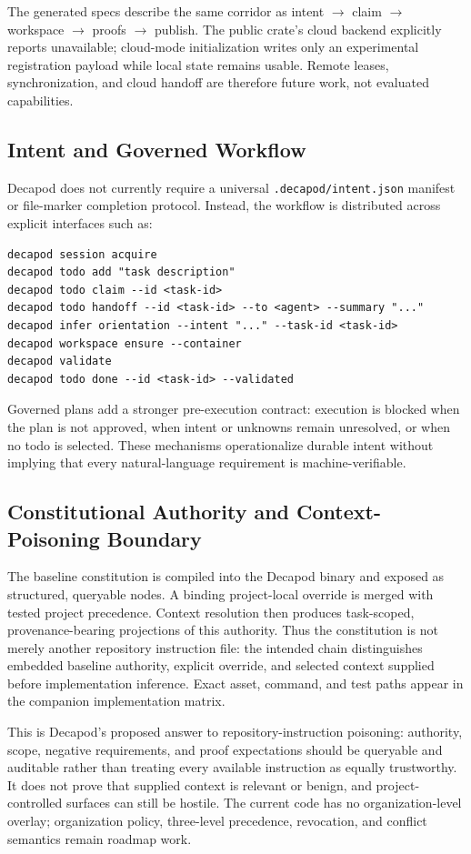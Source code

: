The generated specs describe the same corridor as intent $\rightarrow$ claim $\rightarrow$ workspace $\rightarrow$ proofs $\rightarrow$ publish. The public crate's cloud backend explicitly reports unavailable; cloud-mode initialization writes only an experimental registration payload while local state remains usable. Remote leases, synchronization, and cloud handoff are therefore future work, not evaluated capabilities.

\subsection{Intent and Governed Workflow}
Decapod does not currently require a universal \texttt{.decapod/intent.json} manifest or file-marker completion protocol. Instead, the workflow is distributed across explicit interfaces such as:
\begin{verbatim}
decapod session acquire
decapod todo add "task description"
decapod todo claim --id <task-id>
decapod todo handoff --id <task-id> --to <agent> --summary "..."
decapod infer orientation --intent "..." --task-id <task-id>
decapod workspace ensure --container
decapod validate
decapod todo done --id <task-id> --validated
\end{verbatim}
Governed plans add a stronger pre-execution contract: execution is blocked when the plan is not approved, when intent or unknowns remain unresolved, or when no todo is selected. These mechanisms operationalize durable intent without implying that every natural-language requirement is machine-verifiable.

\subsection{Constitutional Authority and Context-Poisoning Boundary}
The baseline constitution is compiled into the Decapod binary and exposed as structured, queryable nodes. A binding project-local override is merged with tested project precedence. Context resolution then produces task-scoped, provenance-bearing projections of this authority. Thus the constitution is not merely another repository instruction file: the intended chain distinguishes embedded baseline authority, explicit override, and selected context supplied before implementation inference. Exact asset, command, and test paths appear in the companion implementation matrix.

This is Decapod's proposed answer to repository-instruction poisoning: authority, scope, negative requirements, and proof expectations should be queryable and auditable rather than treating every available instruction as equally trustworthy. It does not prove that supplied context is relevant or benign, and project-controlled surfaces can still be hostile. The current code has no organization-level overlay; organization policy, three-level precedence, revocation, and conflict semantics remain roadmap work.

